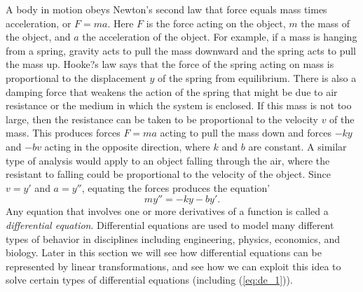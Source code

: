  \label{chap:transformations_eigenvalues}

\vspace*{-17 pt}

\vspace*{13 pt}

\label{sec:appl_diff_eq}

A body in motion obeys Newton's second law that force equals mass times acceleration, or $F = ma$. Here $F$ is the force acting on the object, $m$ the mass of the object, and $a$ the acceleration of the object. For example, if a mass is hanging from a spring, gravity acts to pull the mass downward and the spring acts to pull the mass up. Hooke?s law says that the force of the spring acting on mass is proportional to the displacement $y$ of the spring from equilibrium. There is also a damping force that weakens the action of the spring that might be due to air resistance or the medium in which the system is enclosed. If this mass is not too large, then the resistance can be taken to be proportional to the velocity $v$ of the mass. This produces forces $F = ma$ acting to pull the mass down and forces $-ky$ and  $- bv$ acting in the opposite direction, where $k$ and $b$ are constant. A similar type of analysis would apply to an object falling through the air, where the resistant to falling could be proportional to the velocity of the object. Since $v = y'$ and $a = y''$, equating the forces produces the equation'
\begin{equation} \label{eq:de_1}
my'' = -ky-by'.
\end{equation}
Any equation that involves one or more derivatives of a function is called a \emph{differential equation}. Differential equations are used to model many different types of behavior in disciplines including engineering, physics, economics, and biology.  Later in this section we will see how differential equations can be represented by linear transformations, and see how we can exploit this idea to solve certain types of differential equations (including (\ref{eq:de_1})). 


